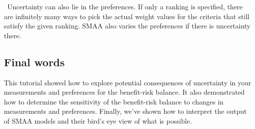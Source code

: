 \documentclass[00_mcda_tutorial.tex]{subfiles}
\begin{document}
\noindent \faGraduationCap \, Uncertainty can also lie in the preferences. If only a ranking is specified, there are infinitely many ways to pick the actual weight values for the criteria that still satisfy the given ranking. SMAA also varies the preferences if there is uncertainty there.

\subsection*{Final words}
This tutorial showed how to explore potential consequences of uncertainty in your measurements and preferences for the benefit-risk balance. It also demonstrated how to determine the sensitivity of the benefit-risk balance to changes in measurements and preferences. Finally, we’ve shown how to interpret the output of SMAA models and their bird’s eye view of what is possible.
\end{document}
